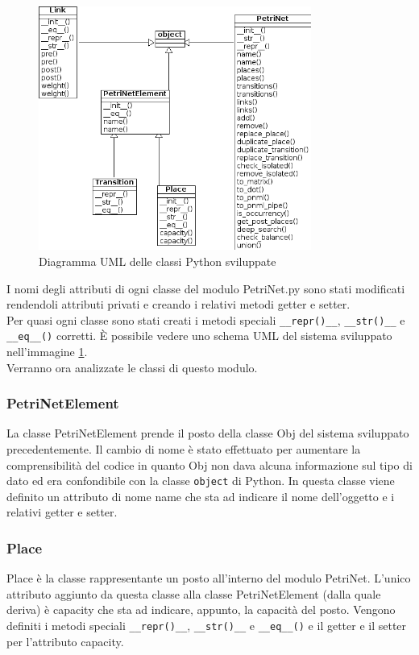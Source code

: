 \documentclass[italian,12pt]{book}
\begin{document}
\begin{figure}[htb]
\centerline{\includegraphics[height=8cm]{img/uml_pyth.png}}
\caption{Diagramma UML delle classi Python sviluppate}\label{fig:uml_pyth.png}
\end{figure}

I nomi degli attributi di ogni classe del modulo PetriNet.py sono stati modificati rendendoli attributi privati
e creando i relativi metodi getter e setter. \\
Per quasi ogni classe sono stati creati i metodi speciali {\tt \_\_repr()\_\_}, {\tt \_\_str()\_\_} e 
{\tt \_\_eq\_\_()} corretti. È possibile vedere uno schema UML del sistema sviluppato nell'immagine \ref{fig:uml_pyth.png}.\\
Verranno ora analizzate le classi di questo modulo.

\subsubsection{PetriNetElement}
La classe PetriNetElement prende il posto della classe Obj del sistema sviluppato precedentemente. Il cambio
di nome è stato effettuato per aumentare la comprensibilità del codice in quanto Obj non dava alcuna informazione
sul tipo di dato ed era confondibile con la classe {\tt object} di Python.
In questa classe viene definito un attributo di nome name che sta ad indicare il nome dell'oggetto e i relativi
getter e setter.

\subsubsection{Place}
Place è la classe rappresentante un posto all'interno del modulo PetriNet. L'unico attributo aggiunto da questa classe alla classe PetriNetElement (dalla quale deriva) è capacity che sta ad indicare, appunto, la capacità del posto. Vengono definiti i metodi speciali {\tt \_\_repr()\_\_}, {\tt \_\_str()\_\_} e {\tt \_\_eq\_\_()} e il getter e il setter per l'attributo capacity.
\end{document}
